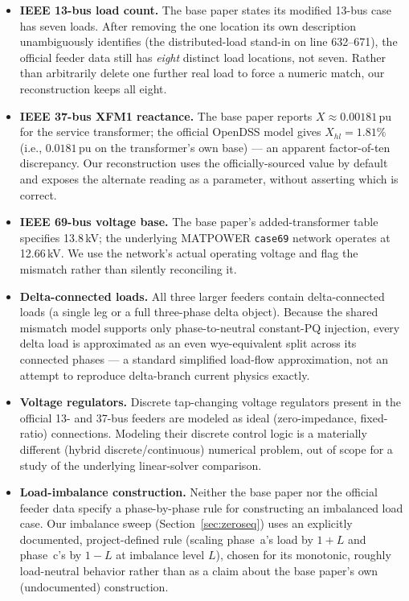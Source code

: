 \documentclass[conference]{IEEEtran}
\begin{document}
\begin{itemize}
\item \textbf{IEEE 13-bus load count.} The base paper states its modified
13-bus case has seven loads. After removing the one location its own
description unambiguously identifies (the distributed-load stand-in on
line 632--671), the official feeder data still has \emph{eight} distinct
load locations, not seven. Rather than arbitrarily delete one further real
load to force a numeric match, our reconstruction keeps all eight.
\item \textbf{IEEE 37-bus XFM1 reactance.} The base paper reports
$X \approx 0.00181$\,pu for the service transformer; the official OpenDSS
model gives $X_{hl} = 1.81\%$ (i.e., $0.0181$\,pu on the transformer's own
base) --- an apparent factor-of-ten discrepancy. Our reconstruction uses
the officially-sourced value by default and exposes the alternate reading
as a parameter, without asserting which is correct.
\item \textbf{IEEE 69-bus voltage base.} The base paper's added-transformer
table specifies 13.8\,kV; the underlying MATPOWER \texttt{case69} network
operates at 12.66\,kV. We use the network's actual operating voltage and
flag the mismatch rather than silently reconciling it.
\item \textbf{Delta-connected loads.} All three larger feeders contain
delta-connected loads (a single leg or a full three-phase delta object).
Because the shared mismatch model supports only phase-to-neutral
constant-PQ injection, every delta load is approximated as an even
wye-equivalent split across its connected phases --- a standard simplified
load-flow approximation, not an attempt to reproduce delta-branch current
physics exactly.
\item \textbf{Voltage regulators.} Discrete tap-changing voltage regulators
present in the official 13- and 37-bus feeders are modeled as ideal
(zero-impedance, fixed-ratio) connections. Modeling their discrete control
logic is a materially different (hybrid discrete/continuous) numerical
problem, out of scope for a study of the underlying linear-solver
comparison.
\item \textbf{Load-imbalance construction.} Neither the base paper nor the
official feeder data specify a phase-by-phase rule for constructing an
imbalanced load case. Our imbalance sweep (Section~\ref{sec:zeroseq}) uses
an explicitly documented, project-defined rule (scaling phase~a's load by
$1+L$ and phase~c's by $1-L$ at imbalance level $L$), chosen for its
monotonic, roughly load-neutral behavior rather than as a claim about the
base paper's own (undocumented) construction.
\end{itemize}
\end{document}
